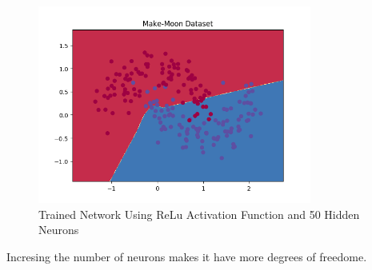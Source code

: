 \documentclass{article}
\begin{document}
		\begin{figure}[!htbp]
		\centering
		\includegraphics[width=90mm]{figures/relu_nnh50.png}
		\caption{Trained Network Using ReLu Activation Function and 50 Hidden Neurons}
	\end{figure}
	
	Incresing the number of neurons makes it have more degrees of freedome.
	
\end{document}

